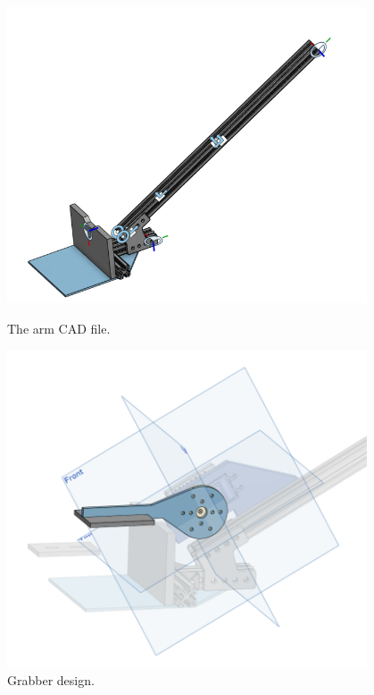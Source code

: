 \begin{figure}[ht]
\centering
\begin{minipage}[b]{.48\textwidth}
  \centering
  \includegraphics[width=0.95\textwidth]{Meetings/October/10-11-21/10-11-21_Hardware_Figure3 - Nathan Forrer.PNG}
  \caption{The arm CAD file.}
  \label{fig:pic3}
\end{minipage}%
\hfill%
\begin{minipage}[b]{.48\textwidth}
  \centering
  \includegraphics[width=0.95\textwidth]{Meetings/October/10-11-21/10-11-21_Hardware_Figure4 - Nathan Forrer.PNG}
  \caption{Grabber design.}
  \label{fig:pic4}
\end{minipage}
\end{figure}

